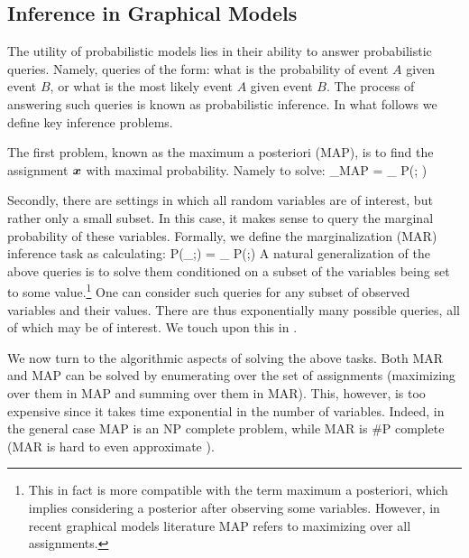 
\subsection{Inference in Graphical Models \label{sec:inference}}
The utility of probabilistic models lies in their ability to answer probabilistic queries. Namely, queries of the form: what is
the probability of event $A$ given event $B$, or what is the most likely event $A$ given event $B$. The process
of answering such queries is known as probabilistic inference. In what follows we define key inference problems. 

The first problem, known as the maximum a posteriori (MAP), is to find the assignment $\boldsymbol{x}$ with maximal probability. Namely to solve:
\be
\label{eq:MAP}
\xx_{MAP} = \arg \max_{\xx \in \cX} P(\xx; \thetav) 
\ee

Secondly, there are settings in which all random variables are of interest, but rather only a small subset. In this case, it makes sense to query the marginal probability of these variables. Formally, we define the marginalization (MAR) inference task as calculating:
\be
\label{eq:MAR}
P(\xx_{\cI};\thetav) = \sum_{} P(\zz;\thetav)
\ee
A natural generalization of the above queries is to solve them conditioned on a subset of the variables being set to some value.\footnote{This in fact is more compatible with the term maximum a posteriori, which implies considering a posterior after observing some variables. However, in recent graphical models literature MAP refers to maximizing over all assignments.} One can 
consider such queries for any subset of observed variables and their values. There are thus exponentially many possible queries, all of which may be of interest. We touch upon this in  \cite{heinemann2014inferning}. 

We now turn to the algorithmic aspects of solving the above tasks. Both MAR and MAP can be solved by enumerating over
the set of assignments (maximizing over them in MAP and summing over them in MAR). This, however, is too expensive since it takes time exponential in the number of variables. Indeed, in the general case MAP  \cite{shimony1994finding} is an NP complete problem, while MAR  \cite{cooper1990computational} is \#P complete (MAR is hard to even approximate  \cite{roth1996hardness}).

